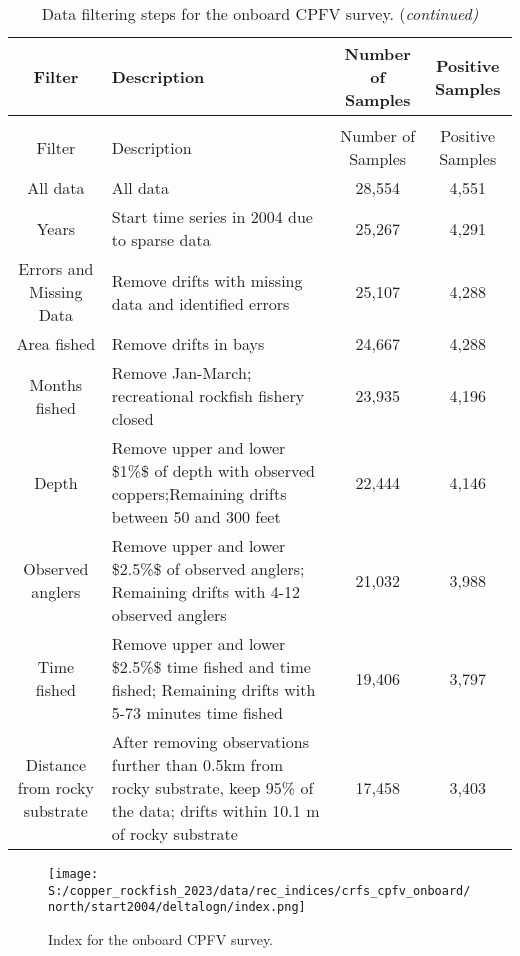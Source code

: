 \documentclass[11pt,
  letterpaper,
]{article}
\begin{document}
\begin{landscape}\begingroup\fontsize{10}{12}\selectfont

\begin{longtable}[t]{c>{\centering\arraybackslash}p{8cm}cc}
\caption{\label{tab:onboard-filter}Data filtering steps for the onboard CPFV survey.}\\
\toprule
Filter & Description & Number of Samples & Positive Samples\\
\midrule
\endfirsthead
\caption[]{Data filtering steps for the onboard CPFV survey. (\textit{continued)}}\\
\toprule
Filter & Description & Number of Samples & Positive Samples\\
\midrule
\endhead

\endfoot
\bottomrule
\endlastfoot
All data & All data & 28,554 & 4,551\\
Years & Start time series in 2004 due to sparse data & 25,267 & 4,291\\
Errors and Missing Data & Remove drifts with missing data and identified errors & 25,107 & 4,288\\
Area fished & Remove drifts in bays & 24,667 & 4,288\\
Months fished & Remove Jan-March; recreational rockfish fishery closed & 23,935 & 4,196\\
Depth & Remove upper and lower \$1\%\$ of depth with observed coppers;Remaining drifts between 50 and 300 feet & 22,444 & 4,146\\
Observed anglers & Remove upper and lower \$2.5\%\$ of observed anglers;  Remaining drifts with 4-12 observed anglers & 21,032 & 3,988\\
Time fished & Remove upper and lower \$2.5\%\$ time fished and
                                         time fished; Remaining drifts with 5-73 minutes time fished & 19,406 & 3,797\\
Distance from rocky substrate & After removing observations further
than 0.5km from rocky substrate, keep 95\% of the data; drifts within 10.1 m of rocky substrate & 17,458 & 3,403\\*
\end{longtable}
\endgroup{}
\end{landscape}
\endgroup{}

\newpage

\newpage

\begin{figure}
{\centering
\texttt{[image: S:/copper\_rockfish\_2023/data/rec\_indices/crfs\_cpfv\_onboard/north/start2004/deltalogn/index.png]}
}
\caption{Index for the onboard CPFV survey.\label{fig:onboard-index}}
\end{figure}
\end{document}
